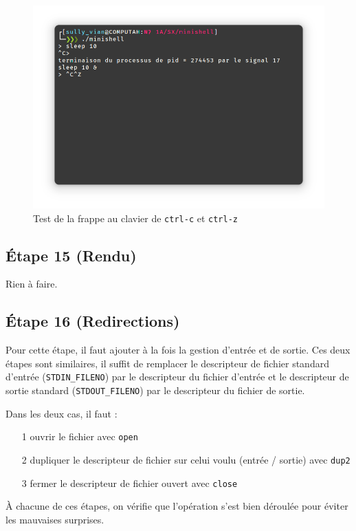 \documentclass{article}
\begin{document}
\begin{figure}[H]
    \centering
    \includegraphics[width=\textwidth]{./resources/E14.png}
    \caption{Test de la frappe au clavier de \texttt{ctrl-c} et \texttt{ctrl-z}}
\end{figure}

\subsection*{Étape 15 (Rendu)}

Rien à faire.

\subsection*{Étape 16 (Redirections)}

Pour cette étape, il faut ajouter à la fois la gestion d'entrée et de sortie. Ces deux étapes sont similaires, il suffit de remplacer le descripteur de fichier standard d'entrée (\texttt{STDIN\_FILENO}) par le descripteur du fichier d'entrée et le descripteur de sortie standard (\texttt{STDOUT\_FILENO}) par le descripteur du fichier de sortie.

Dans les deux cas, il faut :
\begin{itemize}
    \item[1] ouvrir le fichier avec \texttt{open}
    \item[2] dupliquer le descripteur de fichier sur celui voulu (entrée / sortie) avec \texttt{dup2}
    \item[3] fermer le descripteur de fichier ouvert avec \texttt{close}
\end{itemize}
À chacune de ces étapes, on vérifie que l'opération s'est bien déroulée pour éviter les mauvaises surprises.
\end{document}
